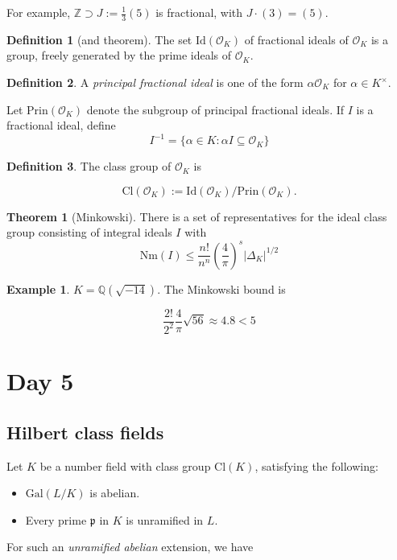 \documentclass{article}
\newcommand{\Z}{\mathbb Z}
\newcommand{\Q}{\mathbb Q}
\newcommand{\gal}[2]{\text{Gal}(#1/#2)}
\newcommand{\iv}[1]{#1^{-1}}
\newcommand{\ok}{\mathcal O_K}
\newcommand{\Nm}[1]{\text{Nm}(#1)}
\newcommand{\Id}[1]{\text{Id}(#1)}
\newcommand{\Cl}[1]{\text{Cl}(#1)}
\newcommand{\Prin}[1]{\text{Prin}(#1)}
\newcommand{\idok}{\Id \ok}
\newcommand{\clok}{\Cl \ok}
\newcommand{\clk}{\Cl K}
\newcommand{\prinok}{\Prin \ok}
\theoremstyle{definition}
\newtheorem*{thm}{Theorem}
\newtheorem*{defn}{Definition}
\newtheorem*{example}{Example}
\begin{document}
For example, $\Z \supset J:= \frac13(5)$ is fractional, with $J \cdot (3) = (5)$.

\begin{defn}[and theorem]
  The set $\idok$ of fractional ideals of $\ok$ is a group, freely generated by
  the prime ideals of $\ok$.
\end{defn}

\begin{defn}
 A \textit{principal fractional ideal}  is one of the form $\alpha\ok$ for
 $\alpha\in K^\times$.
\end{defn}

Let $\prinok$ denote the subgroup of principal fractional ideals. If $I$ is a
fractional ideal, define
$$\iv I = \{\alpha\in K: \alpha I\subseteq \ok\}$$

\begin{defn}
  The class group of $\ok$ is

  $$\clok := \idok/\prinok.$$
\end{defn}

\begin{thm}[Minkowski]
 There is a set of representatives for the ideal class group consisting of
 integral ideals $I$ with
 $$\Nm I \leq \frac{n!}{n^n}\left( \frac 4\pi \right)^s |\Delta_K|^{1/2}$$
\end{thm}

\begin{example}
  $K=\Q(\sqrt{-14})$. The Minkowski bound is

  $$\frac{2!}{2^2}\frac4\pi\sqrt{56} \approx 4.8 < 5$$
\end{example}

\section{Day 5}

\subsection{Hilbert class fields}
Let $K$ be a number field with class group $\clk$, satisfying the following:
\begin{itemize}
\item $\gal L K$ is abelian.
\item Every prime $\mathfrak p$ in $K$ is unramified in $L$.
\end{itemize}

For such an \textit{unramified abelian} extension, we have
\end{document}
